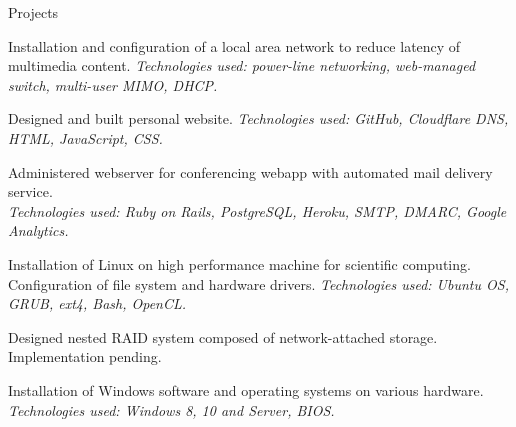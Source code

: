 \documentclass[11pt]{tracv}
\begin{document}
%
%

\pagebreak

\begin{hangingsection}{Projects}
	
	\hangingentry Installation and configuration of a local area network to reduce latency of multimedia content. \textit{Technologies used: power-line networking, web-managed switch, multi-user MIMO, DHCP.}
	
	\hangingentry Designed and built personal website. \textit{Technologies used: GitHub, Cloudflare DNS, HTML, JavaScript, CSS.}
	
	\hangingentry Administered webserver for conferencing webapp with automated mail delivery service. \\ \textit{Technologies used: Ruby on Rails, PostgreSQL, Heroku, SMTP, DMARC, Google Analytics.}
	
	\hangingentry Installation of Linux on high performance machine for scientific computing. Configuration of file system and hardware drivers. \textit{Technologies used: Ubuntu OS, GRUB, ext4, Bash, OpenCL.}
	
	\hangingentry Designed nested RAID system composed of network-attached storage. Implementation pending.
	
	\hangingentry Installation of Windows software and operating systems on various hardware. \\ \textit{Technologies used: Windows 8, 10 and Server, BIOS.}
	
\end{hangingsection}
\end{document}
